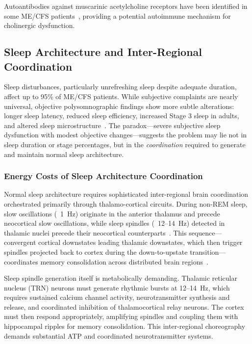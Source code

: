 Autoantibodies against muscarinic acetylcholine receptors have been identified in some ME/CFS patients~\cite{Loebel2016}, providing a potential autoimmune mechanism for cholinergic dysfunction.

\subsection{Sleep Architecture and Inter-Regional Coordination}
\label{sec:sleep-architecture}

Sleep disturbances, particularly unrefreshing sleep despite adequate duration, affect up to 95\% of ME/CFS patients. While subjective complaints are nearly universal, objective polysomnographic findings show more subtle alterations: longer sleep latency, reduced sleep efficiency, increased Stage 3 sleep in adults, and altered sleep microstructure~\cite{Jackson2023sleep}. The paradox---severe subjective sleep dysfunction with modest objective changes---suggests the problem may lie not in sleep duration or stage percentages, but in the \textit{coordination} required to generate and maintain normal sleep architecture.

\subsubsection{Energy Costs of Sleep Architecture Coordination}

Normal sleep architecture requires sophisticated inter-regional brain coordination orchestrated primarily through thalamo-cortical circuits. During non-REM sleep, slow oscillations (~1~Hz) originate in the anterior thalamus and precede neocortical slow oscillations, while sleep spindles (~12--14~Hz) detected in thalamic nuclei precede their neocortical counterparts~\cite{Fernandez2022thalamus}. This sequence---convergent cortical downstates leading thalamic downstates, which then trigger spindles projected back to cortex during the down-to-upstate transition---coordinates memory consolidation across distributed brain regions~\cite{Jiang2024ripples}.

Sleep spindle generation itself is metabolically demanding. Thalamic reticular nucleus (TRN) neurons must generate rhythmic bursts at 12--14~Hz, which requires sustained calcium channel activity, neurotransmitter synthesis and release, and coordinated inhibition of thalamocortical relay neurons. The cortex must then respond appropriately, amplifying spindles and coupling them with hippocampal ripples for memory consolidation. This inter-regional choreography demands substantial ATP and coordinated neurotransmitter systems.

